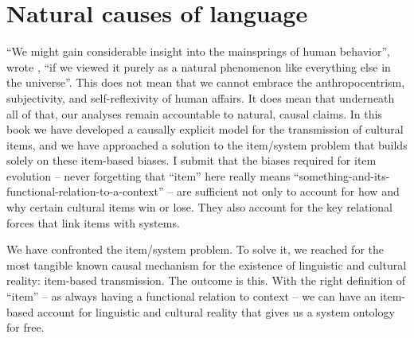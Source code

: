 \section{Natural causes of language}


``We might gain considerable insight into the mainsprings of human 
behavior'', wrote \citet[v]{zipf_human_1949}, ``if we viewed it purely as a natural 
phenomenon like everything else in the universe''. This does not mean 
that we cannot embrace the anthropocentrism, subjectivity, and 
self-reflexivity of human affairs. It does mean that underneath all of 
that, our analyses remain accountable to natural, causal claims. In this book we have developed a causally explicit model for the 
transmission of cultural items, and we have approached a solution to the 
item/system problem that builds solely on these item-based biases. I 
submit that the biases required for item evolution -- never forgetting that 
``item'' here really means 
``something-and-its-functional-relation-to-a-context'' -- are sufficient not 
only to account for how and why certain cultural items win or lose. They 
also account for the key relational forces that link items 
with systems. 


We have confronted the item/system problem. To solve it, we 
reached for the most tangible known causal mechanism for the existence 
of linguistic and cultural reality: item-based transmission. The outcome is this. With the right definition of ``item'' -- as always having a functional relation to context -- we can have 
an item-based account for linguistic and cultural reality that gives us 
a system ontology for free.




